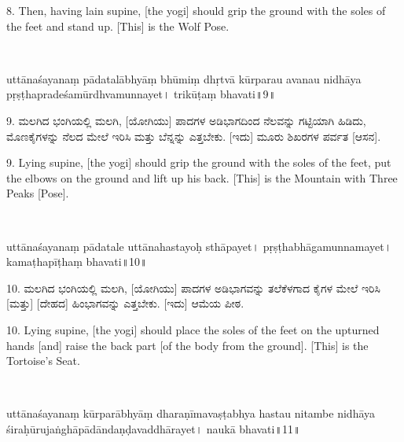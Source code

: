 \begin{eng}
8. Then, having lain supine, [the yogi] should grip  the ground with the soles of the feet and  stand up. [This] is the Wolf Pose.
\end{eng}

\newpage

~\vskip 1cm

\dummyimage
\begin{sans}
uttānaśayanaṃ pādatalābhyāṃ bhūmiṃ dhṛtvā kūrparau avanau nidhāya pṛṣṭhapradeśamūrdhvamunnayet। trikūṭaṃ bhavati॥9॥
\end{sans}
\bigskip

\begin{kan}
9. ಮಲಗಿದ ಭಂಗಿಯಲ್ಲಿ ಮಲಗಿ, [ಯೋಗಿಯು] ಪಾದಗಳ ಅಡಿಭಾಗದಿಂದ ನೆಲವನ್ನು ಗಟ್ಟಿಯಾಗಿ ಹಿಡಿದು, ಮೊಣಕೈಗಳನ್ನು ನೆಲದ ಮೇಲೆ ಇರಿಸಿ ಮತ್ತು ಬೆನ್ನನ್ನು ಎತ್ತಬೇಕು. [ಇದು] ಮೂರು ಶಿಖರಗಳ ಪರ್ವತ [ಆಸನ].
\end{kan}
\bigskip

\begin{eng}
9. Lying supine, [the yogi] should grip the ground with the soles of the feet,  put the elbows on the ground and lift up his back. [This] is the Mountain with Three Peaks [Pose].
\end{eng}


\newpage

~\vskip 1cm

\dummyimage
\begin{sans}
uttānaśayanaṃ pādatale uttānahastayoḥ sthāpayet। pṛṣṭhabhāgamunnamayet। kamaṭhapīṭhaṃ bhavati॥10॥
\end{sans}
\bigskip

\begin{kan}
10. ಮಲಗಿದ ಭಂಗಿಯಲ್ಲಿ ಮಲಗಿ, [ಯೋಗಿಯು] ಪಾದಗಳ ಅಡಿಭಾಗವನ್ನು ತಲೆಕೆಳಗಾದ ಕೈಗಳ ಮೇಲೆ ಇರಿಸಿ [ಮತ್ತು] [ದೇಹದ] ಹಿಂಭಾಗವನ್ನು ಎತ್ತಬೇಕು. [ಇದು] ಆಮೆಯ ಪೀಠ.
\end{kan}
\bigskip

\begin{eng}
10. Lying supine, [the yogi] should place the soles of the feet on the upturned hands [and] raise the back part [of the body from the ground]. [This] is the Tortoise's Seat.
\end{eng}


\newpage

~\vskip 1cm

\dummyimage
\begin{sans}
uttānaśayanaṃ kūrparābhyāṃ dharaṇīmavaṣṭabhya hastau nitambe nidhāya śiraḥūrujaṅghāpādāndaṇḍavaddhārayet। naukā bhavati॥11॥
\end{sans}
\bigskip

